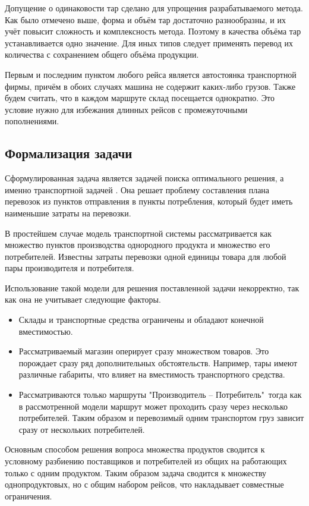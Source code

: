 	Допущение о одинаковости тар сделано для упрощения разрабатываемого метода. Как было отмечено выше, форма и объём тар достаточно разнообразны, и их учёт повысит сложность и комплексность метода. Поэтому в качества объёма тар устанавливается одно значение. Для иных типов следует применять перевод их количества с сохранением общего объёма продукции. 
	
	Первым и последним пунктом любого рейса является автостоянка транспортной фирмы, причём в обоих случаях машина не содержит каких-либо грузов. Также будем считать, что в каждом маршруте склад посещается однократно. Это условие нужно для избежания длинных рейсов с промежуточными пополнениями.

\subsection{Формализация задачи}
	Сформулированная задача является задачей поиска оптимального решения, а именно транспортной задачей \cite{trans:main}. Она решает проблему составления плана перевозок из пунктов отправления в пункты потребления, который будет иметь наименьшие затраты на перевозки. 
	
	В простейшем случае модель транспортной системы рассматривается как множество пунктов производства однородного продукта и множество его потребителей. Известны затраты перевозки одной единицы товара для любой пары производителя и потребителя.
	
	Использование такой модели для решения поставленной задачи некорректно, так как она не учитывает следующие факторы.
	\begin{itemize}
		\item Склады и транспортные средства ограничены и обладают конечной вместимостью.
		\item Рассматриваемый магазин оперирует сразу множеством товаров. Это порождает сразу ряд дополнительных обстоятельств. Например, тары имеют различные габариты, что влияет на вместимость транспортного средства.
		\item Рассматриваются только маршруты "Производитель -- Потребитель"\, тогда как в рассмотренной модели маршрут может проходить сразу через несколько потребителей. Таким образом и перевозимый одним транспортом груз зависит сразу от нескольких потребителей.
	\end{itemize}
		
	Основным способом решения вопроса множества продуктов сводится к условному разбиению поставщиков и потребителей из общих на работающих только с одним продуктом. Таким образом задача сводится к множеству однопродуктовых, но с общим набором рейсов, что накладывает совместные ограничения.
	
